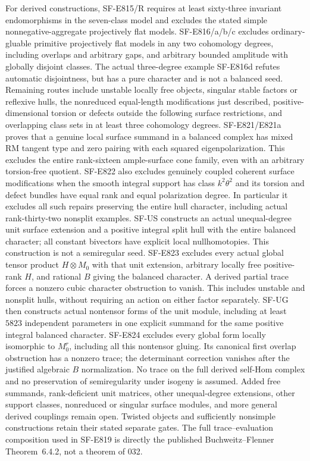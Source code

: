 \documentclass[11pt]{article}
\theoremstyle{remark}\newtheorem{remark}[theorem]{Remark}
\begin{document}
For derived constructions, SF-E815/R requires at least sixty-three
invariant endomorphisms in the seven-class model and excludes the
stated simple nonnegative-aggregate projectively flat models.
SF-E816/a/b/c excludes ordinary-gluable primitive projectively flat
models in any two cohomology degrees, including overlaps and arbitrary
gaps, and arbitrary bounded amplitude with globally disjoint classes.
The actual three-degree example SF-E816d refutes automatic disjointness,
but has a pure character and is not a balanced seed. Remaining routes
include unstable locally free objects, singular stable factors or
reflexive hulls, the nonreduced equal-length modifications just described,
positive-dimensional torsion or defects outside the following surface
restrictions, and overlapping class sets in at least three cohomology
degrees. SF-E821/E821a proves that a genuine local surface summand in
a balanced complex has mixed RM tangent type and zero pairing with
each squared eigenpolarization. This excludes the entire rank-sixteen
ample-surface cone family, even with an arbitrary torsion-free
quotient. SF-E822 also excludes genuinely coupled coherent surface
modifications when the smooth integral support has class
$k^2\theta^2$ and its torsion and defect bundles have equal rank and
equal polarization degree. In particular it excludes all such repairs
preserving the entire hull character, including actual rank-thirty-two
nonsplit examples. SF-US constructs an actual unequal-degree unit
surface extension and a positive integral split hull with the entire
balanced character; all constant bivectors have explicit local
nullhomotopies. This construction is not a semiregular seed.
SF-E823 excludes every actual global tensor product $H\otimes M_0$
with that unit extension, arbitrary locally free positive-rank $H$,
and rational $B$ giving the balanced character. A derived partial trace
forces a nonzero cubic character obstruction to vanish. This includes
unstable and nonsplit hulls, without requiring an action on either
factor separately. SF-UG then constructs actual nontensor forms of
the unit module, including at least $5823$ independent parameters in
one explicit summand for the same positive integral balanced character.
SF-E824 excludes every global form locally isomorphic to $M_0^r$,
including all this nontensor gluing. Its canonical first overlap
obstruction has a nonzero trace; the determinant correction vanishes
after the justified algebraic $B$ normalization. No trace on the full
derived self-Hom complex and no preservation of semiregularity under
isogeny is assumed. Added free summands, rank-deficient unit matrices,
other unequal-degree extensions, other support classes, nonreduced or
singular surface modules, and more general derived couplings remain open. Twisted objects and
sufficiently nonsimple constructions retain their stated separate gates.
The full trace--evaluation composition used in SF-E819 is directly the
published Buchweitz--Flenner Theorem~6.4.2, not a theorem of 032.
\end{document}
